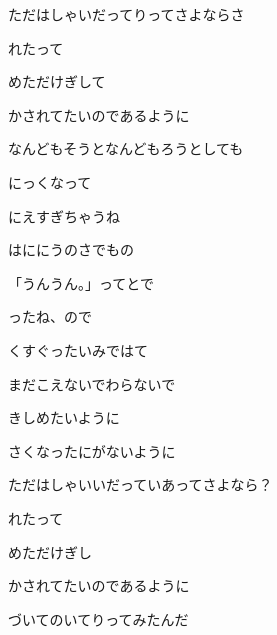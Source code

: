 \documentclass[a4paper,tate,twocolumn,12pt]{ltjtarticle}
\begin{document}
\begin{flushleft}
\begin{minipage}{\linewidth}
ただはしゃいだってりってさよならさ

れたって

めただけぎして

かされてたいのであるように
\end{minipage}

\vspace{2em}

\noindent\begin{minipage}{\linewidth}
なんどもそうとなんどもろうとしても

にっくなって

にえすぎちゃうね

はににうのさでもの

「うんうん。」ってとで

ったね、ので

くすぐったいみではて
\end{minipage}

\vspace{2em}

\noindent\begin{minipage}{\linewidth}
まだこえないでわらないで

きしめたいように

さくなったにがないように

ただはしゃいいだっていあってさよなら？

れたって

めただけぎし

かされてたいのであるように
\end{minipage}

\vspace{2em}

\noindent\begin{minipage}{\linewidth}
づいてのいてりってみたんだ


\end{minipage}
\end{flushleft}
\end{document}
